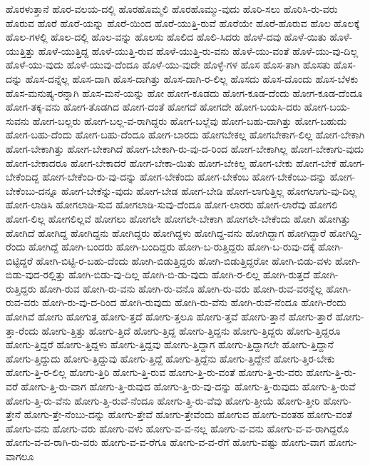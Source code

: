 {ಹೊರಳುತ್ತಾನೆ
ಹೊರ-ವಲಯ-ದಲ್ಲಿ
ಹೊರಹೊಮ್ಮಲಿ
ಹೊರಹೊಮ್ಮು-ವುದು
ಹೊರಿ-ಸಲು
ಹೊರಿಸಿ-ರು-ವರು
ಹೊರುವ
ಹೊರೆ
ಹೊರೆ-ಯನ್ನು
ಹೊರೆ-ಯಿಂದ
ಹೊರೆ-ಯುತ್ತಿ-ರುವೆ
ಹೊರೆಯೇ
ಹೊರೆ-ಹೊರುವ
ಹೊಲ
ಹೊಲಕ್ಕೆ
ಹೊಲ-ಗಳಲ್ಲಿ
ಹೊಲ-ದಲ್ಲಿ
ಹೊಲ-ವನ್ನು
ಹೊಲಸು
ಹೊಲಿದ
ಹೊಲಿ-ಸಿದರು
ಹೊಳೆ-ದವು
ಹೊಳೆ-ಯಿತು
ಹೊಳೆ-ಯುತ್ತಿತ್ತು
ಹೊಳೆ-ಯುತ್ತಿದ್ದ
ಹೊಳೆ-ಯುತ್ತಿ-ರುವ
ಹೊಳೆ-ಯುತ್ತಿ-ರು-ವನು
ಹೊಳೆ-ಯು-ವಂತೆ
ಹೊಳೆ-ಯು-ವು-ದಿಲ್ಲ
ಹೊಳೆ-ಯು-ವುದು
ಹೊಳೆ-ಯುವು-ದೆಂದೂ
ಹೊಳೆ-ಯು-ವುದೇ
ಹೊಳ್ಳೆ-ಗಳ
ಹೊಸ
ಹೊಸ-ತಾಗಿ
ಹೊಸತು
ಹೊಸ-ದನ್ನು
ಹೊಸ-ದನ್ನೆಲ್ಲ
ಹೊಸ-ದಾಗಿ
ಹೊಸ-ದಾಗಿತ್ತು
ಹೊಸ-ದಾಗಿ-ರ-ಲಿಲ್ಲ
ಹೊಸದು
ಹೊಸ-ದೊಂದು
ಹೊಸ-ಬೆಳಕು
ಹೊಸ-ಮನುಷ್ಯ-ರನ್ನಾಗಿ
ಹೊಸ-ಮನೆ-ಯನ್ನು
ಹೋ
ಹೋಗ-ಕೂಡದು
ಹೋಗ-ಕೂಡ-ದೆಂದು
ಹೋಗ-ಕೂಡ-ದೆಂದೂ
ಹೋಗ-ತಕ್ಕ-ವನು
ಹೋಗ-ತೊಡಗಿದ
ಹೋಗ-ದಂತೆ
ಹೋಗದೆ
ಹೋಗದೇ
ಹೋಗ-ಬಯಸಿ-ದರು
ಹೋಗ-ಬಯ-ಸುವನು
ಹೋಗ-ಬಲ್ಲರು
ಹೋಗ-ಬಲ್ಲ-ವ-ರಾಗಿದ್ದರು
ಹೋಗ-ಬಲ್ಲೆವು
ಹೋಗ-ಬಹು-ದಾಗಿತ್ತು
ಹೋಗ-ಬಹುದು
ಹೋಗ-ಬಹು-ದೆಂದು
ಹೋಗ-ಬಹು-ದೆಂದೂ
ಹೋಗ-ಬಾರದು
ಹೋಗಬೇಕಲ್ಲ
ಹೋಗಬೇಕಾಗ-ಲಿಲ್ಲ
ಹೋಗ-ಬೇಕಾಗಿ
ಹೋಗ-ಬೇಕಾಗಿತ್ತು
ಹೋಗ-ಬೇಕಾಗಿದೆ
ಹೋಗ-ಬೇಕಾಗಿ-ರು-ವು-ದ-ರಿಂದ
ಹೋಗ-ಬೇಕಾಗಿಲ್ಲ
ಹೋಗ-ಬೇಕಾಗು-ವುದು
ಹೋಗ-ಬೇಕಾದರೂ
ಹೋಗ-ಬೇಕಾದರೆ
ಹೋಗ-ಬೇಕಾ-ಯಿತು
ಹೋಗ-ಬೇಕಿಲ್ಲ
ಹೋಗ-ಬೇಕು
ಹೋಗ-ಬೇಕೆ
ಹೋಗ-ಬೇಕೆಂದಿದ್ದ
ಹೋಗ-ಬೇಕೆಂದಿ-ರು-ವು-ದನ್ನು
ಹೋಗ-ಬೇಕೆಂದು
ಹೋಗ-ಬೇಕೆಂಬ
ಹೋಗ-ಬೇಕೆಂಬು-ದನ್ನು
ಹೋಗ-ಬೇಕೆಂಬು-ದನ್ನೂ
ಹೋಗ-ಬೇಕೆನ್ನು-ವುದು
ಹೋಗ-ಬೇಡ
ಹೋಗ-ಬೇಡಿ
ಹೋಗ-ಲಾಗುತ್ತಿಲ್ಲ
ಹೋಗಲಾಗು-ವು-ದಿಲ್ಲ
ಹೋಗ-ಲಾಡಿಸಿ
ಹೋಗಲಾಡಿ-ಸುವ
ಹೋಗಲಾಡಿ-ಸುವು-ದೆಂದೂ
ಹೋಗ-ಲಾರರು
ಹೋಗ-ಲಾರೆವು
ಹೋಗಲಿ
ಹೋಗ-ಲಿಲ್ಲ
ಹೋಗಲಿಲ್ಲವೆ
ಹೋಗಲು
ಹೋಗಲೇ
ಹೋಗಲೇ-ಬೇಕಾಗಿ
ಹೋಗಲೇ-ಬೇಕೆಂದು
ಹೋಗಿ
ಹೋಗಿತ್ತು
ಹೋಗಿದೆ
ಹೋಗಿದ್ದ
ಹೋಗಿದ್ದನು
ಹೋಗಿದ್ದರು
ಹೋಗಿದ್ದಳು
ಹೋಗಿದ್ದ-ವನು
ಹೋಗಿದ್ದಾಗ
ಹೋಗಿದ್ದಾರೆ
ಹೋಗಿದ್ದಿ-ರೆಂದು
ಹೋಗಿದ್ದೆ
ಹೋಗಿ-ಬಂದರು
ಹೋಗಿ-ಬಂದಿದ್ದರು
ಹೋಗಿ-ಬ-ರುತ್ತಿದ್ದರು
ಹೋಗಿ-ಬ-ರುವು-ದಕ್ಕೆ
ಹೋಗಿ-ಬಿಟ್ಟಿದ್ದರೆ
ಹೋಗಿ-ಬಿಟ್ಟಿ-ರ-ಬಹು-ದೆಂದು
ಹೋಗಿ-ಬಿಡುತ್ತಿದ್ದರು
ಹೋಗಿ-ಬಿಡುತ್ತಿದ್ದರೋ
ಹೋಗಿ-ಬಿಡು-ವಳು
ಹೋಗಿ-ಬಿಡು-ವುದ-ರಲ್ಲಿತ್ತು
ಹೋಗಿ-ಬಿಡು-ವು-ದಿಲ್ಲ
ಹೋಗಿ-ಬಿ-ಡು-ವುದು
ಹೋಗಿ-ರ-ಲಿಲ್ಲ
ಹೋಗಿ-ರುತ್ತದೆ
ಹೋಗಿ-ರುತ್ತಿದ್ದರು
ಹೋಗಿ-ರುವ
ಹೋಗಿ-ರು-ವನು
ಹೋಗಿ-ರು-ವನೊ
ಹೋಗಿ-ರು-ವರು
ಹೋಗಿ-ರುವ-ವರನ್ನೆಲ್ಲ
ಹೋಗಿ-ರುವ-ವರು
ಹೋಗಿ-ರು-ವು-ದ-ರಿಂದ
ಹೋಗಿ-ರುವುದು
ಹೋಗಿ-ರು-ವೆನು
ಹೋಗಿ-ರುವೆ-ನೆಂದೂ
ಹೋಗಿ-ರೆಂದು
ಹೋಗಿವೆ
ಹೋಗು
ಹೋಗುತ್ತ
ಹೋಗು-ತ್ತದೆ
ಹೋಗು-ತ್ತಲೂ
ಹೋಗು-ತ್ತವೆ
ಹೋಗು-ತ್ತಾನೆ
ಹೋಗು-ತ್ತಾರೆ
ಹೋಗು-ತ್ತಾ-ರೆಂದು
ಹೋಗು-ತ್ತಿತ್ತು
ಹೋಗು-ತ್ತಿದೆ
ಹೋಗು-ತ್ತಿದ್ದ
ಹೋಗು-ತ್ತಿದ್ದನು
ಹೋಗು-ತ್ತಿದ್ದರು
ಹೋಗು-ತ್ತಿದ್ದರೂ
ಹೋಗು-ತ್ತಿದ್ದರೆ
ಹೋಗು-ತ್ತಿದ್ದಳು
ಹೋಗು-ತ್ತಿದ್ದವು
ಹೋಗು-ತ್ತಿದ್ದಾಗ
ಹೋಗು-ತ್ತಿದ್ದಾಗಲೇ
ಹೋಗು-ತ್ತಿದ್ದಾನೆ
ಹೋಗು-ತ್ತಿದ್ದುದು
ಹೋಗು-ತ್ತಿದ್ದುವು
ಹೋಗು-ತ್ತಿದ್ದೆ
ಹೋಗು-ತ್ತಿದ್ದೆನು
ಹೋಗು-ತ್ತಿದ್ದೇನೆ
ಹೋಗು-ತ್ತಿರ-ಬೇಕು
ಹೋಗು-ತ್ತಿ-ರ-ಲಿಲ್ಲ
ಹೋಗು-ತ್ತಿರಿ
ಹೋಗು-ತ್ತಿ-ರುವ
ಹೋಗು-ತ್ತಿ-ರು-ವಂತೆ
ಹೋಗು-ತ್ತಿ-ರು-ವರು
ಹೋಗು-ತ್ತಿ-ರು-ವರೆ
ಹೋಗು-ತ್ತಿ-ರು-ವಾಗ
ಹೋಗು-ತ್ತಿ-ರುವುದ
ಹೋಗು-ತ್ತಿ-ರು-ವು-ದನ್ನು
ಹೋಗು-ತ್ತಿ-ರುವುದು
ಹೋಗು-ತ್ತಿ-ರುವೆ
ಹೋಗು-ತ್ತಿ-ರು-ವೆನು
ಹೋಗು-ತ್ತಿ-ರುವೆ-ನೆಂದೂ
ಹೋಗು-ತ್ತಿ-ರು-ವೆವು
ಹೋಗು-ತ್ತೀಯೆ
ಹೋಗು-ತ್ತೀರಿ
ಹೋಗು-ತ್ತೇನೆ
ಹೋಗು-ತ್ತೇ-ನೆಂಬು-ದನ್ನು
ಹೋಗು-ತ್ತೇವೆ
ಹೋಗು-ತ್ತೇವೆಂದು
ಹೋಗುವ
ಹೋಗು-ವಂತಹ
ಹೋಗು-ವಂತೆ
ಹೋಗು-ವನು
ಹೋಗು-ವರು
ಹೋಗು-ವಳು
ಹೋಗು-ವ-ವ-ನಲ್ಲ
ಹೋಗು-ವ-ವನು
ಹೋಗು-ವ-ವ-ರಾಗಿದ್ದರೊ
ಹೋಗು-ವ-ವ-ರಾಗಿ-ರು-ವರು
ಹೋಗು-ವ-ವ-ರೆಗೂ
ಹೋಗು-ವ-ವ-ರೆಗೆ
ಹೋಗು-ವಷ್ಟು
ಹೋಗು-ವಾಗ
ಹೋಗು-ವಾಗಲೂ
}
